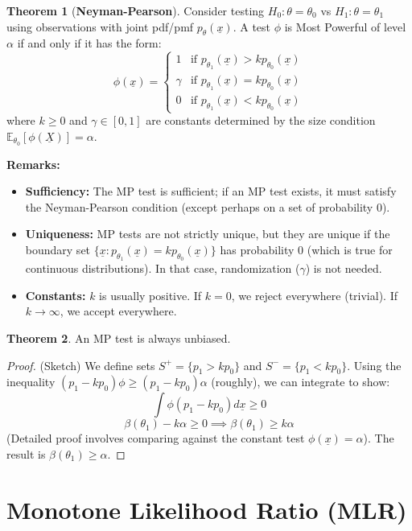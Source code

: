 \documentclass[12pt, a4paper]{article}
\theoremstyle{definition}
\newtheorem{theorem}{Theorem}
\newcommand{\E}{\mathbb{E}}
\newcommand{\xvec}{\underline{x}}
\newcommand{\Xvec}{\underline{X}}
\begin{document}
\begin{theorem}[\textbf{Neyman-Pearson}]
Consider testing $H_0: \theta = \theta_0$ vs $H_1: \theta = \theta_1$ using observations with joint pdf/pmf $p_\theta(\xvec)$.
A test $\phi$ is Most Powerful of level $\alpha$ if and only if it has the form:
$$ 
\phi(\xvec) = 
\begin{cases} 
1 & \text{if } p_{\theta_1}(\xvec) > k p_{\theta_0}(\xvec) \\
\gamma & \text{if } p_{\theta_1}(\xvec) = k p_{\theta_0}(\xvec) \\
0 & \text{if } p_{\theta_1}(\xvec) < k p_{\theta_0}(\xvec)
\end{cases}
$$
where $k \ge 0$ and $\gamma \in [0,1]$ are constants determined by the size condition $\E_{\theta_0}[\phi(\Xvec)] = \alpha$.
\end{theorem}

\textbf{Remarks:}
\begin{itemize}
    \item \textbf{Sufficiency:} The MP test is sufficient; if an MP test exists, it must satisfy the Neyman-Pearson condition (except perhaps on a set of probability 0).
    \item \textbf{Uniqueness:} MP tests are not strictly unique, but they are unique if the boundary set $\{ \xvec : p_{\theta_1}(\xvec) = k p_{\theta_0}(\xvec) \}$ has probability 0 (which is true for continuous distributions). In that case, randomization ($\gamma$) is not needed.
    \item \textbf{Constants:} $k$ is usually positive. If $k=0$, we reject everywhere (trivial). If $k \to \infty$, we accept everywhere.
\end{itemize}

\begin{theorem}
An MP test is always unbiased.
\end{theorem}
\begin{proof}
(Sketch) We define sets $S^+ = \{p_1 > k p_0\}$ and $S^- = \{p_1 < k p_0\}$.
Using the inequality $(p_1 - k p_0)\phi \ge (p_1 - k p_0)\alpha$ (roughly), we can integrate to show:
$$ \int \phi (p_1 - k p_0) d\xvec \ge 0 $$
$$ \beta(\theta_1) - k \alpha \ge 0 \implies \beta(\theta_1) \ge k \alpha $$
(Detailed proof involves comparing against the constant test $\phi(\xvec) = \alpha$).
The result is $\beta(\theta_1) \ge \alpha$.
\end{proof}

\section{Monotone Likelihood Ratio (MLR)}
\end{document}
